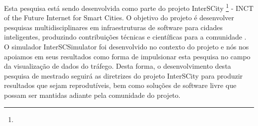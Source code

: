 Esta pesquisa está sendo desenvolvida como parte do projeto InterSCity
\footnote{} - INCT of the Future Internet for Smart
Cities. O objetivo do projeto é desenvolver pesquisas multidisciplinares em
infraestruturas de software para cidades inteligentes, produzindo contribuições
técnicas e científicas para a comunidade \citep{Daniel2016}. O simulador InterSCSimulator foi
desenvolvido no contexto do projeto e nós nos apoiamos em seus resultados como
forma de impulsionar esta pesquisa no campo da visualização de dados do
tráfego. Desta forma, o desenvolvimento desta pesquisa de mestrado seguirá as
diretrizes do projeto InterSCity para produzir resultados que sejam
reprodutíveis, bem como soluções de software livre que possam ser mantidas
adiante pela comunidade do projeto.
